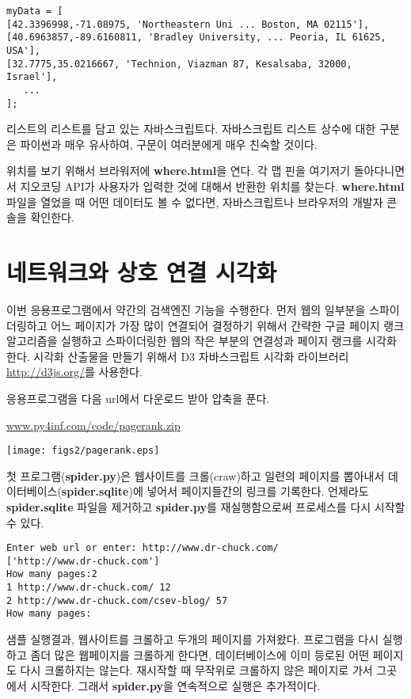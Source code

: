 \beforeverb
\begin{verbatim}
myData = [
[42.3396998,-71.08975, 'Northeastern Uni ... Boston, MA 02115'],
[40.6963857,-89.6160811, 'Bradley University, ... Peoria, IL 61625, USA'],
[32.7775,35.0216667, 'Technion, Viazman 87, Kesalsaba, 32000, Israel'],
   ...
];
\end{verbatim}
\afterverb
%

리스트의 리스트를 담고 있는 자바스크립트다. 자바스크립트 리스트 상수에 대한 구분은 파이썬과 매우 유사하여,
구문이 여러분에게 매우 친숙할 것이다.

위치를 보기 위해서 브라워저에 {\bf where.html}을 연다. 
각 맵 핀을 여기저기 돌아다니면서 지오코딩 API가 사용자가 입력한 것에 대해서 반환한 위치를 찾는다.
{\bf where.html} 파일을 열었을 때 어떤 데이터도 볼 수 없다면, 자바스크립트나 브라우저의 개발자 콘솔을 확인한다.

\section{네트워크와 상호 연결 시각화}

이번 응용프로그램에서 약간의 검색엔진 기능을 수행한다.
먼저 웹의 일부분을 스파이더링하고 어느 페이지가 가장 많이 연결되어 결정하기 위해서
간략한 구글 페이지 랭크 알고리즘을 실행하고
스파이더링한 웹의 작은 부분의 연결성과 페이지 랭크를 시각화한다. 
시각화 산출물을 만들기 위해서 D3 자바스크립트 시각화 라이브러리 \url{http://d3js.org/}를 사용한다.

응용프로그램을 다음 url에서 다운로드 받아 압축을 푼다.

\url{www.py4inf.com/code/pagerank.zip}

\beforefig
\centerline{\texttt{[image: figs2/pagerank.eps]}}
\afterfig

첫 프로그램({\bf spider.py})은 웹사이트를 크롤(craw)하고 일련의 페이지를 뽑아내서 데이터베이스({\bf spider.sqlite})에 넣어서 페이지들간의 링크를 기록한다. 
언제라도 {\bf spider.sqlite}  파일을 제거하고 {\bf spider.py}를 재실행함으로써 프로세스를 다시 시작할 수 있다.

\beforeverb
\begin{verbatim}
Enter web url or enter: http://www.dr-chuck.com/
['http://www.dr-chuck.com']
How many pages:2
1 http://www.dr-chuck.com/ 12
2 http://www.dr-chuck.com/csev-blog/ 57
How many pages:
\end{verbatim}
\afterverb
%

샘플 실행결과, 웹사이트를 크롤하고 두개의 페이지를 가져왔다.
프로그램을 다시 실행하고 좀더 많은 웹페이지를 크롤하게 한다면,
데이터베이스에 이미 등로된 어떤 페이지도 다시 크롤하지는 않는다.
재시작할 때 무작위로 크롤하지 않은 페이지로 가서 그곳에서 시작한다.
그래서 {\bf spider.py}을 연속적으로 실행은 추가적이다.

